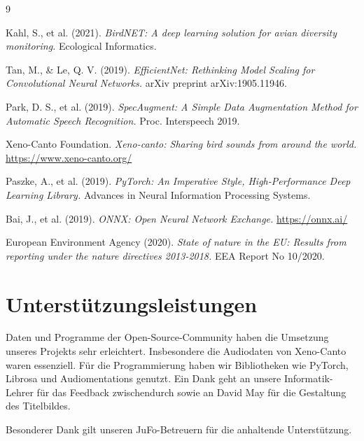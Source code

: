 \documentclass[10pt, a4paper]{scrartcl}
\begin{document}
\newpage
\renewcommand\refname{Quellen- und Literaturverzeichnis}
\begin{thebibliography}{9}

Kahl, S., et al. (2021).
\textit{BirdNET: A deep learning solution for avian diversity monitoring.}
Ecological Informatics.

Tan, M., \& Le, Q. V. (2019).
\textit{EfficientNet: Rethinking Model Scaling for Convolutional Neural Networks.}
arXiv preprint arXiv:1905.11946.

Park, D. S., et al. (2019).
\textit{SpecAugment: A Simple Data Augmentation Method for Automatic Speech Recognition.}
Proc. Interspeech 2019.

Xeno-Canto Foundation.
\textit{Xeno-canto: Sharing bird sounds from around the world.}
\url{https://www.xeno-canto.org/}

Paszke, A., et al. (2019).
\textit{PyTorch: An Imperative Style, High-Performance Deep Learning Library.}
Advances in Neural Information Processing Systems.

Bai, J., et al. (2019).
\textit{ONNX: Open Neural Network Exchange.}
\url{https://onnx.ai/}

European Environment Agency (2020).
\textit{State of nature in the EU: Results from reporting under the nature directives 2013-2018.}
EEA Report No 10/2020.

\end{thebibliography}

\newpage
\section*{Unterstützungsleistungen}
Daten und Programme der Open-Source-Community haben die Umsetzung unseres Projekts sehr erleichtert. Insbesondere die Audiodaten von Xeno-Canto waren essenziell. Für die Programmierung haben wir Bibliotheken wie PyTorch, Librosa und Audiomentations genutzt. Ein Dank geht an unsere Informatik-Lehrer für das Feedback zwischendurch sowie an David May für die Gestaltung des Titelbildes.

Besonderer Dank gilt unseren JuFo-Betreuern für die anhaltende Unterstützung.
\end{document}
